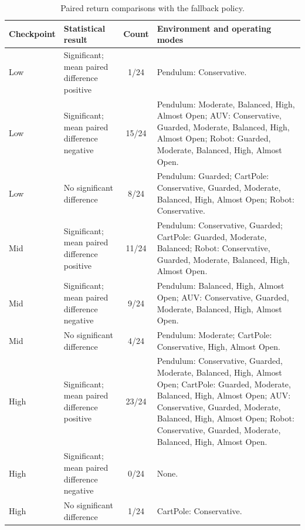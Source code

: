 \begin{table}[t]
  \centering
  \caption{Paired return comparisons with the fallback policy.}
  \label{tab:comparisons_with_fallback}
  \scriptsize
  \begin{tabularx}{\columnwidth}{llcX}
    \toprule
    Checkpoint & Statistical result & Count & Environment and operating modes \\
    \midrule
    Low & Significant; mean paired difference positive & 1/24 & Pendulum: Conservative. \\
    Low & Significant; mean paired difference negative & 15/24 & Pendulum: Moderate, Balanced, High, Almost Open; AUV: Conservative, Guarded, Moderate, Balanced, High, Almost Open; Robot: Guarded, Moderate, Balanced, High, Almost Open. \\
    Low & No significant difference & 8/24 & Pendulum: Guarded; CartPole: Conservative, Guarded, Moderate, Balanced, High, Almost Open; Robot: Conservative. \\
    \midrule
    Mid & Significant; mean paired difference positive & 11/24 & Pendulum: Conservative, Guarded; CartPole: Guarded, Moderate, Balanced; Robot: Conservative, Guarded, Moderate, Balanced, High, Almost Open. \\
    Mid & Significant; mean paired difference negative & 9/24 & Pendulum: Balanced, High, Almost Open; AUV: Conservative, Guarded, Moderate, Balanced, High, Almost Open. \\
    Mid & No significant difference & 4/24 & Pendulum: Moderate; CartPole: Conservative, High, Almost Open. \\
    \midrule
    High & Significant; mean paired difference positive & 23/24 & Pendulum: Conservative, Guarded, Moderate, Balanced, High, Almost Open; CartPole: Guarded, Moderate, Balanced, High, Almost Open; AUV: Conservative, Guarded, Moderate, Balanced, High, Almost Open; Robot: Conservative, Guarded, Moderate, Balanced, High, Almost Open. \\
    High & Significant; mean paired difference negative & 0/24 & None. \\
    High & No significant difference & 1/24 & CartPole: Conservative. \\
    \bottomrule
  \end{tabularx}
\end{table}
